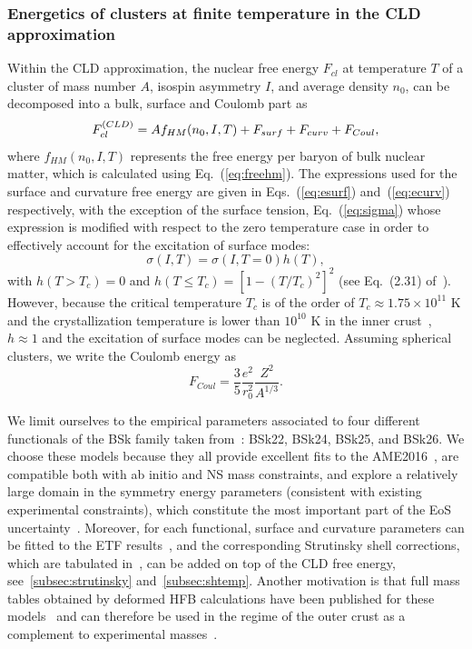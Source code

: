 \subsubsection{Energetics of clusters at finite temperature in the CLD
approximation}

Within the CLD approximation, the nuclear free energy $F_{cl}$ at temperature 
$T$ of a cluster of mass number $A$, isospin asymmetry $I$, and average density 
$n_0$, can be decomposed into a bulk, surface and Coulomb part as
%
\begin{equation}
  F_{cl}^{\text(CLD)} = A f_{HM}(n_0,I,T) + F_{surf} + F_{curv} + F_{Coul},
\end{equation}
%
where $f_{HM}(n_0, I, T)$ represents the free energy per baryon of bulk nuclear
matter, which is calculated using Eq.~(\ref{eq:freehm}).
The expressions used for the surface and curvature free energy are given
in Eqs.~(\ref{eq:esurf}) and~(\ref{eq:ecurv}) respectively, with the exception
of the surface tension, Eq.~(\ref{eq:sigma}) whose expression is modified with 
respect to the zero temperature case in order to effectively account for the 
excitation of surface modes:
%
\begin{equation}
  \sigma(I,T) = \sigma(I, T=0)h(T), 
\end{equation}
%
with $h(T>T_c) = 0$ and $h(T \leq T_c) = [1-(T/T_c)^2]^2$ (see Eq.~(2.31)
of~\cite{Lattimer1991}).
However, because the critical temperature $T_c$ is of the order of 
$T_c \approx 1.75 \times 10^{11}$ K and the crystallization temperature is 
lower than $10^{10}$ K in the inner crust~\cite{Haensel2007}, $h\approx 1$ and 
the excitation of surface modes can be neglected.
Assuming spherical clusters, we write the Coulomb energy as
%
\begin{equation}
  F_{Coul} = \frac{3}{5}\frac{e^2}{r_0^2}\frac{Z^2}{A^{1/3}}.
\end{equation}
%

We limit ourselves to the empirical parameters 
associated to four different functionals of the BSk family taken 
from~\cite{Goriely2013}: BSk22, BSk24, BSk25, and BSk26.
We choose these models because they all provide excellent fits to the 
AME2016~\cite{Huang2017}, are compatible both with ab initio and NS mass 
constraints, and explore a relatively large domain in the symmetry energy 
parameters (consistent with existing experimental constraints), which 
constitute the most important part of the EoS 
uncertainty~\cite{Pearson2014,Pearson2018}. Moreover, for each functional, 
surface and curvature parameters can be fitted to the ETF 
results~\cite{Pearson2019}, and the corresponding Strutinsky shell corrections, 
which are tabulated in~\cite{Pearson2018}, can be added on top of the CLD free 
energy, see~\ref{subsec:strutinsky} and~\ref{subsec:shtemp}.
Another motivation is that full mass tables obtained by deformed HFB 
calculations have been published for these models~\cite{Xu2013} and can 
therefore be used in the regime of the outer crust as a
complement to experimental masses~\cite{Fantina2020}.

